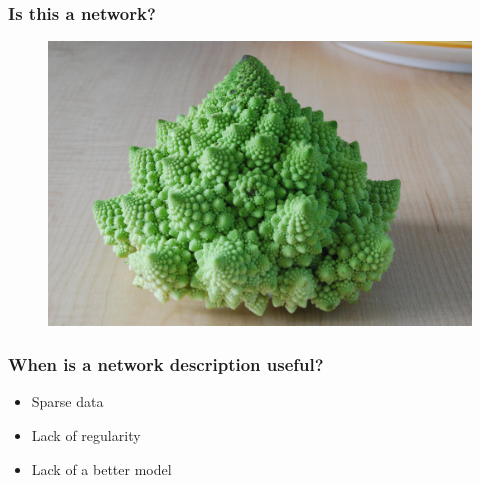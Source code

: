 \documentclass{beamer}
\begin{document}
\begin{frame}
    \frametitle{Is this a network?}
\begin{figure}
    \begin{center}
        \includegraphics[width=0.7\columnwidth]{cauliflower.jpeg}
    \end{center}
\end{figure}
\end{frame}
\begin{frame}
    \frametitle{When is a network description useful?}
    \pause
    \begin{itemize}
    \setlength\itemsep{1em}
        \item{Sparse data}
    \pause
        \item{Lack of regularity}
    \pause
        \item{Lack of a better model}
    \end{itemize}
\end{frame}
\end{document}
